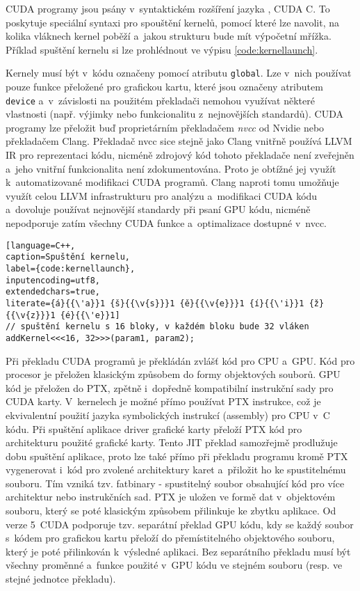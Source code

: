 CUDA programy jsou psány v~syntaktickém rozšíření jazyka \CPP, CUDA C. To poskytuje speciální syntaxi pro spouštění kernelů, pomocí které lze navolit, na kolika vláknech kernel poběží a~jakou strukturu bude mít výpočetní mřížka. Příklad spuštění kernelu si lze prohlédnout ve výpisu \ref{code:kernellaunch}.

Kernely musí být v~kódu označeny pomocí atributu \texttt{global}. Lze v~nich používat pouze funkce přeložené pro grafickou kartu, které jsou označeny atributem \texttt{device} a~v~závislosti na použitém překladači nemohou využívat některé vlastnosti \CPP \hspace{1mm}(např. výjimky nebo funkcionalitu z~nej\-novějších \CPP \hspace{1mm}standardů). CUDA programy lze přeložit buď proprietárním překladačem \emph{nvcc} od Nvidie nebo překladačem Clang. Překladač nvcc sice stejně jako Clang vnitřně používá LLVM IR pro reprezentaci kódu, nicméně zdrojový kód tohoto překladače není zveřejněn a~jeho vnitřní funkcionalita není zdokumentována. Proto je obtížné jej využít k~automatizované modifikaci CUDA programů. Clang naproti tomu umožňuje využít celou LLVM infrastrukturu pro analýzu a~modifikaci CUDA kódu a~dovoluje používat nejnovější \CPP \hspace{1mm}standardy při psaní GPU kódu, nicméně nepodporuje zatím všechny CUDA funkce a~optimalizace dostupné v~nvcc.

\begin{lstlisting}[language=C++,
caption=Spuštění kernelu,
label={code:kernellaunch},
inputencoding=utf8,
extendedchars=true,
literate={á}{{\'a}}1 {š}{{\v{s}}}1 {ě}{{\v{e}}}1 {í}{{\'i}}1 {ž}{{\v{z}}}1 {é}{{\'e}}1]
// spuštění kernelu s 16 bloky, v každém bloku bude 32 vláken
addKernel<<<16, 32>>>(param1, param2);
\end{lstlisting}

Při překladu CUDA programů je překládán zvlášť kód pro CPU a~GPU. Kód pro procesor je přeložen klasickým způsobem do formy objektových souborů. GPU kód je přeložen do PTX, zpětně i~dopředně kompatibilní instrukční sady pro CUDA karty. V~kernelech je možné přímo používat PTX instrukce, což je ekvivalentní použití jazyka symbolických instrukcí (assembly) pro CPU v~C kódu. Při spuštění aplikace driver grafické karty přeloží PTX kód pro architekturu použité grafické karty. Tento JIT překlad samozřejmě prodlužuje dobu spuštění aplikace, proto lze také přímo při překladu programu kromě PTX vygenerovat i~kód pro zvolené architektury karet a~přiložit ho ke spustitelnému souboru. Tím vzniká tzv. fatbinary - spustitelný soubor obsahující kód pro více architektur nebo instrukčních sad. PTX je uložen ve formě dat v~objektovém souboru, který se poté klasickým způsobem přilinkuje ke zbytku aplikace. Od verze 5~CUDA podporuje tzv. separátní překlad GPU kódu, kdy se každý soubor s~kódem pro grafickou kartu přeloží do přemístitelného objektového souboru, který je poté přilinkován k~výsledné aplikaci. Bez separátního překladu musí být všechny proměnné a~funkce použité v~GPU kódu ve stejném souboru (resp. ve stejné jednotce překladu).

